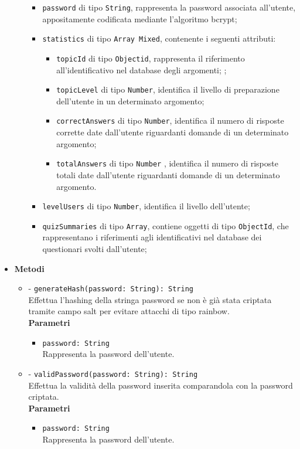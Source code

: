 \begin{itemize}
\begin{itemize}
\begin{itemize}
				\item
					\texttt{password} di tipo \texttt{String}, rappresenta la password associata all'utente,  appositamente codificata mediante l'algoritmo bcrypt;  		
				\item
					\texttt{statistics} di tipo \texttt{Array Mixed}, contenente i seguenti attributi:
				\begin{itemize}
					\item
						\texttt{topicId} di tipo \texttt{Objectid}, rappresenta il riferimento all'identificativo nel database degli argomenti;		; 
					\item
						 \texttt{topicLevel} di tipo \texttt{Number}, identifica il livello di preparazione dell'utente in un determinato argomento;
					\item
						\texttt{correctAnswers} di tipo \texttt{Number}, identifica il numero di risposte corrette date dall'utente riguardanti domande di un determinato argomento; 
					\item						
						 \texttt{totalAnswers} di tipo \texttt{Number} , identifica il numero di risposte totali date dall'utente riguardanti domande di un determinato argomento.		
				\end{itemize}		
				\item 
					\texttt{levelUsers} di tipo \texttt{Number}, identifica il livello dell'utente;				
				
				\item
					\texttt{quizSummaries} di tipo \texttt{Array}, contiene oggetti di tipo \texttt{ObjectId}, che rappresentano i riferimenti agli identificativi nel database dei questionari svolti dall'utente;		
			\end{itemize}	
		\end{itemize}	
	\item \textbf{Metodi}
		\begin{itemize}
		\item
		- \texttt{generateHash(password: String): String} \\
		Effettua l'hashing della stringa password se non è già stata criptata tramite campo salt per evitare attacchi di tipo rainbow. \\
		\textbf{Parametri} 
			\begin{itemize}
			\item
				 \texttt{password: String} \\
				Rappresenta la password dell'utente.
			\end{itemize}
		\item
		- \texttt{validPassword(password: String): String} \\
		Effettua la validità della password inserita comparandola con la password criptata.	\\
		\textbf{Parametri} 
			\begin{itemize}
			\item
				\texttt{password: String} \\
				Rappresenta la password dell'utente.
			\end{itemize}
		\end{itemize}	
\end{itemize}